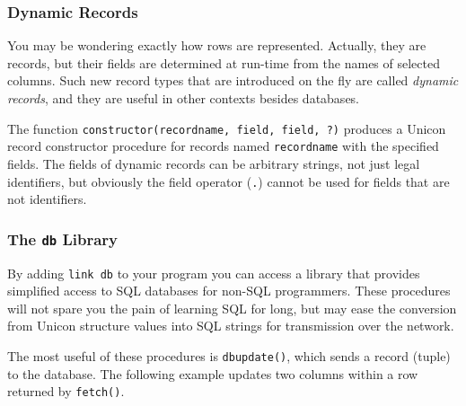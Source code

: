 
\subsubsection{Dynamic Records}

You may be wondering exactly how rows are represented. Actually, they
are records, but their fields are determined at run-time from the names
of selected columns. Such new record types that are introduced on the
fly are called \textit{dynamic records}, and they are useful in other
contexts besides databases.

The function \texttt{constructor(recordname, field, field, ?)} produces a
Unicon record constructor procedure for records named
\texttt{recordname} with the specified fields. The fields of dynamic
records can be arbitrary strings, not just legal identifiers, but
obviously the field operator (\texttt{.}) cannot be used for fields
that are not identifiers.

\subsubsection[The db Library]{The \texttt{db} Library}
By adding \texttt{link db} to your program you can access a library that
provides simplified access to SQL databases for non-SQL programmers.
These procedures will not spare you the pain of learning SQL for long,
but may ease the conversion from Unicon structure values into SQL
strings for transmission over the network.

The most useful of these procedures is \texttt{dbupdate()}, which sends
a record (tuple) to the database. The following example updates two
columns within a row returned by \texttt{fetch()}.


